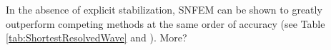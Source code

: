 \documentclass[11pt]{article}
\begin{document}
In the absence of explicit stabilization, SNFEM can be shown to greatly outperform competing methods at the same order of accuracy (see Table \ref{tab:ShortestResolvedWave} and \cite{PAU2013QJRMS}). {\color{blue} More?}






\end{document}
